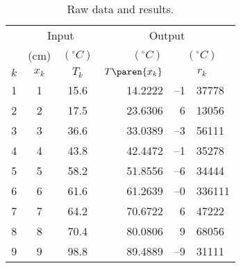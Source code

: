 \begin{table}[h]
	\caption{Raw data and results.}
	\begin{center}
		\begin{tabular}{rcc|rr@{.}l}
		  & \multicolumn{2}{c}{Input} &  \multicolumn{3}{c}{Output} \\
		  & (cm) & $(^{\circ}C)$ & $(^{\circ}C)$ & \multicolumn{2}{c}{$(^{\circ}C)$} \\
		  $k$ & $x_{k} $ & $T_{k}$ & $T\paren{x_{k}}$ & \multicolumn{2}{c}{$r_{k}$} \\\hline
			 1 & 1 & 15.6 & 14.2222 & --1 & 37778 \\
			 2 & 2 & 17.5 & 23.6306 &   6 & 13056 \\
			 3 & 3 & 36.6 & 33.0389 & --3 & 56111 \\
			 4 & 4 & 43.8 & 42.4472 & --1 & 35278 \\
			 5 & 5 & 58.2 & 51.8556 & --6 & 34444 \\
			 6 & 6 & 61.6 & 61.2639 & --0 & 336111 \\
			 7 & 7 & 64.2 & 70.6722 &   6 & 47222 \\
			 8 & 8 & 70.4 & 80.0806 &   9 & 68056 \\
			 9 & 9 & 98.8 & 89.4889 & --9 & 31111 \\
		\end{tabular}
	\end{center}
	\label{tab:bevington data and results}
\end{table}%

